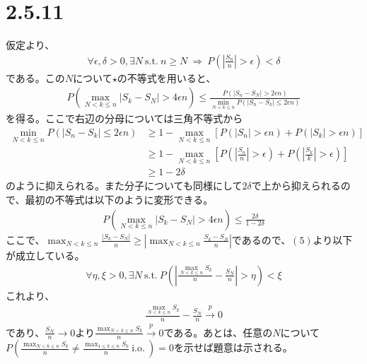 \documentclass{article}
\begin{document}
\section{2.5.11}
仮定より、
\begin{align*}
	\forall \epsilon, \delta > 0, \exists N\ \text{s.t.}\ n\geq N\ \Rightarrow\  P\left( \left| \frac{S_n}{n} \right| > \epsilon \right) < \delta
\end{align*}
である。この$N$について$\star$の不等式を用いると、
\begin{align*}
	P\left( \max_{N<k\leq n} \left|S_k - S_N\right| > 4\epsilon n \right) \leq\frac{P\left( \left| S_n -S_N \right| > 2\epsilon n \right)}{\min_{N<k \leq n}P\left( \left| S_n - S_k \right| \leq 2\epsilon n \right)}
\end{align*}
を得る。ここで右辺の分母については三角不等式から
\begin{align*}
	\min_{N<k \leq n}P\left( \left| S_n - S_k \right| \leq 2\epsilon n \right) &\geq 1 - \max_{N<k \leq n} \left[ P\left( \left| S_n \right| > \epsilon n \right) + P\left( \left| S_k \right| > \epsilon n \right) \right]\\[10pt]
	&\geq 1- \max_{N<k \leq n} \left[ P\left( \left| \frac{S_n}{n} \right| > \epsilon \right) + P\left( \left| \frac{S_k}{k} \right| > \epsilon \right) \right]\\[10pt]
	&\geq 1 - 2 \delta
\end{align*}
のように抑えられる。また分子についても同様にして$2\delta$で上から抑えられるので、最初の不等式は以下のように変形できる。
\begin{align}
	P\left( \max_{N<k\leq n} \left|S_k - S_N\right| > 4\epsilon n \right) \leq \frac{2\delta}{1 - 2\delta}
\end{align}
ここで、$\max_{N<k\leq n} \frac{\left| S_k - S_N \right|}{n} \geq \left| \max_{N<k\leq n} \frac{S_k - S_N}{n} \right|$であるので、$(5)$より以下が成立している。
\begin{align*}
	\forall \eta, \xi > 0, \exists N\ \text{s.t.}\ P\left( \left| \frac{\max_{N<k\leq n} S_k}{n} - \frac{S_N}{n} \right| > \eta \right) < \xi
\end{align*}
これより、
\begin{align*}
	 \frac{\max_{N<k\leq n} S_k}{n} - \frac{S_N}{n} \xrightarrow{p} 0
\end{align*}
であり、$\frac{S_N}{n} \to 0$より$\frac{\max_{N<k\leq n} S_k}{n} \xrightarrow{p} 0$である。あとは、任意の$N$について$P\left( \frac{\max_{N<k\leq n} S_k}{n} \neq \frac{\max_{1\leq k\leq n} S_k}{n}\ \text{i.o.}\ \right) = 0$を示せば題意は示される。
\end{document}
